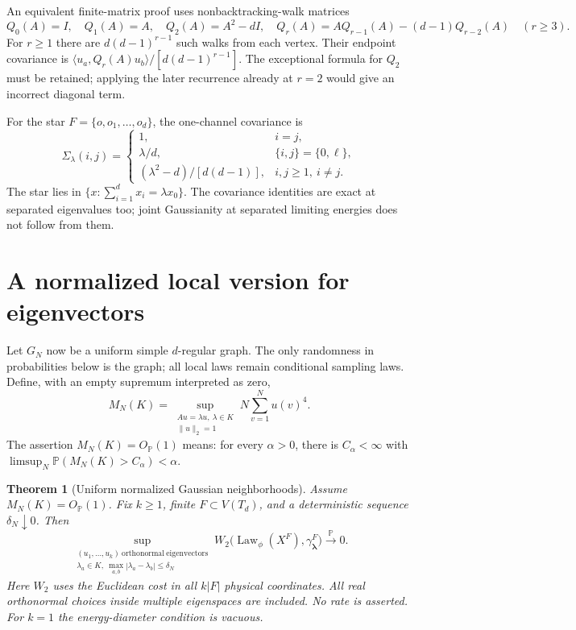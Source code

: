\documentclass[11pt]{article}
\numberwithin{equation}{section}
\newtheorem{theorem}{Theorem}[section]
\theoremstyle{definition}
\theoremstyle{remark}
\newcommand{\PP}{\mathbb P}
\newcommand{\Law}{\operatorname{Law}}
\begin{document}
An equivalent finite-matrix proof uses nonbacktracking-walk matrices
\[
 Q_0(A)=I,\quad Q_1(A)=A,\quad Q_2(A)=A^2-dI,\quad
 Q_r(A)=AQ_{r-1}(A)-(d-1)Q_{r-2}(A)\quad(r\geq3).
\]
For $r\geq1$ there are $d(d-1)^{r-1}$ such walks from each vertex.
Their endpoint covariance is
$\langle u_a,Q_r(A)u_b\rangle/[d(d-1)^{r-1}]$.
The exceptional formula for $Q_2$ must be retained; applying the later
recurrence already at $r=2$ would give an incorrect diagonal term.

For the star $F=\{o,o_1,\ldots,o_d\}$, the one-channel covariance is
\begin{equation}\label{eq:star-cov}
 \Sigma_\lambda(i,j)=
 \begin{cases}
 1,&i=j,\\
 \lambda/d,&\{i,j\}=\{0,\ell\},\\
 (\lambda^2-d)/[d(d-1)],&i,j\geq1,\ i\ne j.
 \end{cases}
\end{equation}
The star lies in $\{x:\sum_{i=1}^d x_i=\lambda x_0\}$.
The covariance identities are exact at separated eigenvalues too;
joint Gaussianity at separated limiting energies does not follow from them.

\section{A normalized local version for eigenvectors}\label{sec:normalized}
Let $G_N$ now be a uniform simple $d$-regular graph. The only randomness
in probabilities below is the graph; all local laws remain conditional
sampling laws. Define, with an empty supremum interpreted as zero,
\begin{equation}\label{eq:M}
 M_N(K)=\sup_{\substack{Au=\lambda u,\ \lambda\in K\\\|u\|_2=1}}
          N\sum_{v=1}^N u(v)^4.
\end{equation}
The assertion $M_N(K)=O_{\PP}(1)$ means: for every $\alpha>0$, there is
$C_\alpha<\infty$ with
$\limsup_N\PP(M_N(K)>C_\alpha)<\alpha$.

\begin{theorem}[Uniform normalized Gaussian neighborhoods]\label{thm:main}
Assume $M_N(K)=O_{\PP}(1)$. Fix $k\geq1$, finite
$F\subset V(T_d)$, and a deterministic sequence $\delta_N\downarrow0$.
Then
\begin{equation}\label{eq:main}
 \sup_{\substack{(u_1,\ldots,u_k)\ \mathrm{orthonormal}\ \mathrm{eigenvectors}\\
 \lambda_a\in K,\ \max_{a,b}|\lambda_a-\lambda_b|\leq\delta_N}}
 W_2\bigl(\Law_\phi(X^F),\gamma^F_{\boldsymbol\lambda}\bigr)
 \xrightarrow{\PP}0.
\end{equation}
Here $W_2$ uses the Euclidean cost in all $k|F|$ physical coordinates.
All real orthonormal choices inside multiple eigenspaces are included.
No rate is asserted. For $k=1$ the energy-diameter condition is vacuous.
\end{theorem}
\end{document}
